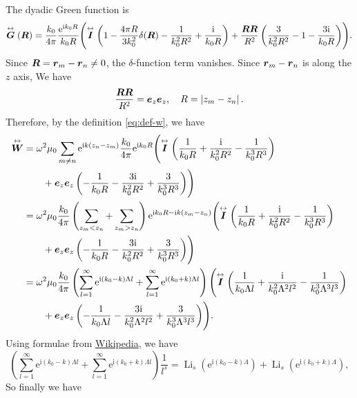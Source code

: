 \documentclass[hyperref, a4paper]{article}
\newcommand*{\ii}{\mathrm{i}}
\newcommand*{\ee}{\mathrm{e}}
\DeclareMathOperator{\li}{Li}
\renewcommand{\tensor}[1]{ \stackrel{\leftrightarrow}{\vb*{#1}}}
\begin{document}
The dyadic Green function is 
\begin{equation}
    \tensor{G}(\vb*{R}) = \frac{k_0}{4\pi} \frac{\ee^{\ii k_0 R}}{k_0 R} \Biggl( \tensor{I} \left( 1 - \frac{4\pi R}{3k_0^2} \delta(\vb*{R}) - \frac{1}{k_0^2 R^2} + \frac{\ii}{k_0 R} \right) 
        + \frac{\vb*{R} \vb*{R}}{R^2} \left( \frac{3}{k_0^2 R^2} - 1 - \frac{3\ii}{k_0 R} \right) \Biggr).
\end{equation}
Since $\vb*{R} = \vb*{r}_m - \vb*{r}_n \neq 0$, the $\delta$-function term vanishes. Since $\vb*{r}_m - \vb*{r}_n$
is along the $z$ axis, We have 
\[
    \frac{\vb*{R} \vb*{R}}{R^2} = \vb*{e}_z \vb*{e}_z, \quad R = \abs*{z_m - z_n}.
\]
Therefore, by the definition \eqref{eq:def-w}, we have 
\[
    \begin{aligned}
        \tensor{\vb*{W}} &= \omega^2 \mu_0 \sum_{m \neq n} \ee^{\ii k(z_n - z_m)} \frac{k_0}{4\pi} \ee^{\ii k_0 R}
        \Biggl( \tensor{\vb*{I}} \left( \frac{1}{k_0 R} + \frac{\ii}{k_0^2 R^2} - \frac{1}{k_0^3 R^3} \right) \\
        &\quad \quad + \vb*{e}_z \vb*{e}_z \left( - \frac{1}{k_0 R} - \frac{3 \ii}{k_0^2 R^2} + \frac{3}{k_0^3 R^3} \right) \Biggr) \\
        &= \omega^2 \mu_0 \frac{k_0}{4\pi} \left( \sum_{z_m < z_n} + \sum_{z_m > z_n} \right) \ee^{\ii k_0 R - \ii k (z_m - z_n)} \Biggl( \tensor{\vb*{I}} \left( \frac{1}{k_0 R} + \frac{\ii}{k_0^2 R^2} - \frac{1}{k_0^3 R^3} \right) \\
        &\quad \quad + \vb*{e}_z \vb*{e}_z \left( - \frac{1}{k_0 R} - \frac{3 \ii}{k_0^2 R^2} + \frac{3}{k_0^3 R^3} \right) \Biggr) \\ 
        &= \omega^2 \mu_0 \frac{k_0}{4\pi} \left( \sum_{l=1}^\infty \ee^{\ii (k_0 - k) \Lambda l} + \sum_{l=1}^\infty \ee^{\ii (k_0 + k) \Lambda l} \right) \Biggl( \tensor{\vb*{I}} \left( \frac{1}{k_0 \Lambda l} + \frac{\ii}{k_0^2 \Lambda^2 l^2} - \frac{1}{k_0^3 \Lambda^3 l^3} \right) \\
        &\quad \quad + \vb*{e}_z \vb*{e}_z \left( - \frac{1}{k_0 \Lambda l} - \frac{3 \ii}{k_0^2 \Lambda^2 l^2} + \frac{3}{k_0^3 \Lambda^3 l^3} \right) \Biggr) .
    \end{aligned}
\] 
Using formulae from \href{https://en.wikipedia.org/wiki/Polylogarithm}{Wikipedia}, we have 
\[
    \left( \sum_{l=1}^\infty \ee^{\ii (k_0 - k) \Lambda l} + \sum_{l=1}^\infty \ee^{\ii (k_0 + k) \Lambda l} \right) \frac{1}{l^s} = \li_s(\ee^{\ii (k_0 - k) \Lambda}) + \li_s(\ee^{\ii (k_0 + k) \Lambda}),
\]
So finally we have 
\end{document}
